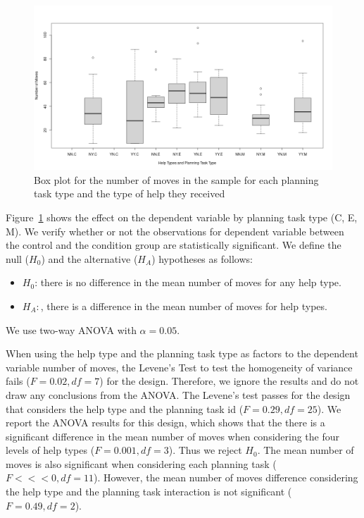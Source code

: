\begin{figure}[tpb]
  \centering
\includegraphics[width=0.7\columnwidth]{img/helpsbytype.png}
  \caption{Box plot for the number of moves in the sample for each planning task type and the type of help they received}
  \label{fig:helpsbytype}
\end{figure}
Figure~\ref{fig:helpsbytype} shows the effect on the dependent variable by planning task type (C, E, M).
We verify whether or not the observations for dependent variable between the control and the condition group are statistically significant.
We define the null ($H_0$) and the alternative ($H_A$) hypotheses as follows:
\begin{itemize}
\item $H_0$: there is no difference in the mean number of moves for any help type.
\item $H_A:$, there is a difference in the mean number of moves for help types.
\end{itemize}
We use two-way ANOVA with $\alpha=0.05$.

When using the help type and the planning task type as factors to the dependent variable number of moves, the Levene's Test to test the homogeneity of variance fails ($F=0.02, df=7$) for the design.
Therefore, we ignore the results and do not draw any conclusions from the ANOVA.
The  Levene's test passes for the design that considers the help type and the planning task id ($F=0.29, df=25$).
We report the ANOVA results for this design, which shows that the there is a significant difference in the mean number of moves when considering the four levels of help types ($F=0.001, df=3$).
Thus we reject $H_0$.
The mean number of moves is also significant when considering each planning task ($F<<<0, df=11$).
However, the mean number of moves difference considering the help type and the planning task interaction is not significant ($F=0.49, df=2$).

